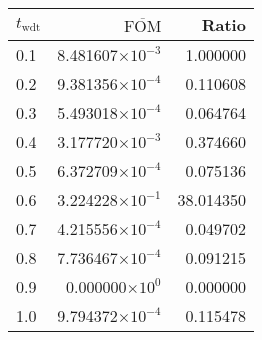 \begin{tabular}{lrr}
\toprule
$t_{\mathrm{wdt}}$ & $\overline{\mathrm{FOM}}$ &     Ratio \\
\midrule
               0.1 &  8.481607$\times 10^{-3}$ &  1.000000 \\
               0.2 &  9.381356$\times 10^{-4}$ &  0.110608 \\
               0.3 &  5.493018$\times 10^{-4}$ &  0.064764 \\
               0.4 &  3.177720$\times 10^{-3}$ &  0.374660 \\
               0.5 &  6.372709$\times 10^{-4}$ &  0.075136 \\
               0.6 &  3.224228$\times 10^{-1}$ & 38.014350 \\
               0.7 &  4.215556$\times 10^{-4}$ &  0.049702 \\
               0.8 &  7.736467$\times 10^{-4}$ &  0.091215 \\
               0.9 &   0.000000$\times 10^{0}$ &  0.000000 \\
               1.0 &  9.794372$\times 10^{-4}$ &  0.115478 \\
\bottomrule
\end{tabular}
